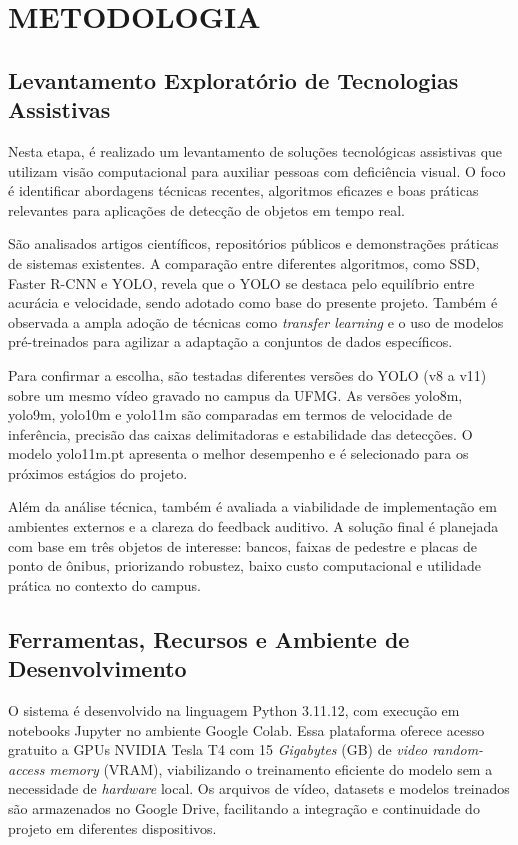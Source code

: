 \chapter{\textbf{METODOLOGIA}}
\section{\textbf{Levantamento Exploratório de Tecnologias Assistivas}}

Nesta etapa, é realizado um levantamento de soluções tecnológicas assistivas que utilizam visão computacional para auxiliar pessoas com deficiência visual. O foco é identificar abordagens técnicas recentes, algoritmos eficazes e boas práticas relevantes para aplicações de detecção de objetos em tempo real.

São analisados artigos científicos, repositórios públicos e demonstrações práticas de sistemas existentes. A comparação entre diferentes algoritmos, como SSD, Faster R-CNN e YOLO, revela que o YOLO se destaca pelo equilíbrio entre acurácia e velocidade, sendo adotado como base do presente projeto. Também é observada a ampla adoção de técnicas como \textit{transfer learning} e o uso de modelos pré-treinados para agilizar a adaptação a conjuntos de dados específicos.

Para confirmar a escolha, são testadas diferentes versões do YOLO (v8 a v11) sobre um mesmo vídeo gravado no campus da UFMG. As versões yolo8m, yolo9m, yolo10m e yolo11m são comparadas em termos de velocidade de inferência, precisão das caixas delimitadoras e estabilidade das detecções. O modelo yolo11m.pt apresenta o melhor desempenho e é selecionado para os próximos estágios do projeto.

Além da análise técnica, também é avaliada a viabilidade de implementação em ambientes externos e a clareza do feedback auditivo. A solução final é planejada com base em três objetos de interesse: bancos, faixas de pedestre e placas de ponto de ônibus, priorizando robustez, baixo custo computacional e utilidade prática no contexto do campus.

\section{\textbf{Ferramentas, Recursos e Ambiente de Desenvolvimento}}

O sistema é desenvolvido na linguagem Python 3.11.12, com execução em notebooks Jupyter no ambiente Google Colab. Essa plataforma oferece acesso gratuito a GPUs NVIDIA Tesla T4 com 15 \textit{Gigabytes} (GB) de \textit{video random-access memory} (VRAM), viabilizando o treinamento eficiente do modelo sem a necessidade de \textit{hardware} local. Os arquivos de vídeo, datasets e modelos treinados são armazenados no Google Drive, facilitando a integração e continuidade do projeto em diferentes dispositivos.

